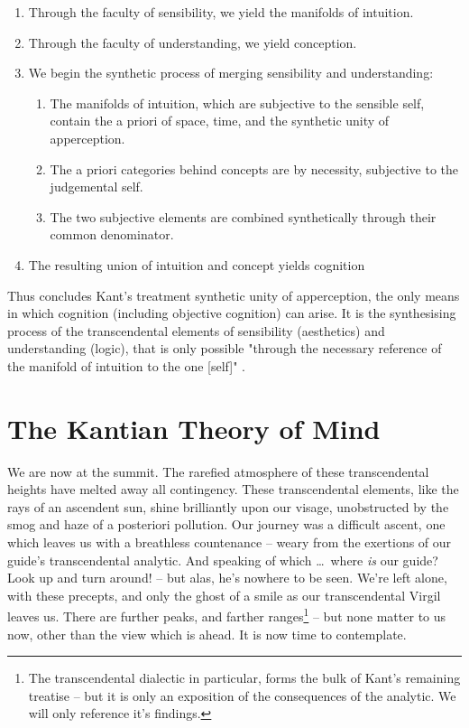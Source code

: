 
\begin{enumerate}
  \item Through the faculty of sensibility, we yield the manifolds of intuition.
  \item Through the faculty of understanding, we yield conception.
  \item We begin the synthetic process of merging sensibility and understanding:
  \begin{enumerate}
    \item The manifolds of intuition, which are subjective to the sensible self, contain the a priori of space, time, and the synthetic unity of apperception.
    \item The a priori categories behind concepts are by necessity, subjective to the judgemental self.
    \item The two subjective elements are combined synthetically through their common denominator.
  \end{enumerate}
  \item The resulting union of intuition and concept yields cognition
\end{enumerate}

\noindent
Thus concludes Kant's treatment synthetic unity of apperception, the only means in which cognition (including objective cognition) can arise. It is the synthesising process of the transcendental elements of sensibility (aesthetics) and understanding (logic), that is only possible "through the necessary reference of the manifold of intuition to the one [self]" \autocite[B140]{hackett}.

\section*{The Kantian Theory of Mind}
We are now at the summit. The rarefied atmosphere of these transcendental heights have melted away all contingency. These transcendental elements, like the rays of an ascendent sun, shine brilliantly upon our visage, unobstructed by the smog and haze of a posteriori pollution. Our journey was a difficult ascent, one which leaves us with a breathless countenance -- weary from the exertions of our guide's transcendental analytic. And speaking of which \ldots\ where \emph{is} our guide? Look up and turn around! -- but alas, he's nowhere to be seen. We're left alone, with these precepts, and only the ghost of a smile as our transcendental Virgil leaves us. There are further peaks, and farther ranges\footnote{The transcendental dialectic in particular, forms the bulk of Kant's remaining treatise -- but it is only an exposition of the consequences of the analytic. We will only reference it's findings.} -- but none matter to us now, other than the view which is ahead. It is now time to contemplate.

